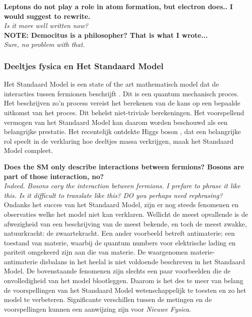 \textbf{ Leptons do not play a role in atom formation, but electron does.. I would suggest to rewrite.}\\
{\color{green}\it Is it more well written now?}\\

\textbf{NOTE: Democitus is a philosopher? That is what I wrote...}\\
{\color{green}\it Sure, no problem with that.}\\

\subsubsection{Deeltjes fysica en Het Standaard Model}
Het Standaard Model is een state of the art mathematisch model dat de interacties tussen fermionen beschrijft \cite{sm-glashow,sm-weinberg,sm-salam}. Dit is een quantum mechanisch proces. Het beschrijven zo'n process vereist het berekenen van de kans op een bepaalde uitkomst van het proces. Dit behelst niet-triviale berekeningen. Het voorspellend vermogen van het Standaard Model kan daarom worden beschouwd als een belangrijke prestatie. Het recentelijk ontdekte Higgs boson \cite{higgs-cms,higgs-atlas}, dat een belangrijke rol speelt in de verklaring hoe deeltjes massa verkrijgen, maak het Standaard Model compleet.

\textbf{Does the SM only describe interactions between fermions? Bosons are part of those interaction, no?}\\
{\color{green}\it Indeed. Bosons cary the interaction between fermions. I prefare to phrase it like this.
Is it difficult to translate like this? DO you perhaps need rephrasing?}\\

Ondanks het succes van het Standaard Model, zijn er nog steeds fenomenen en observaties welke het model niet kan verklaren. Wellicht de meest opvallende is de afwezigheid van een beschrijving van de meest bekende, en toch de meest zwakke, natuurkracht: de zwaartekracht. Een ander voorbeeld betreft antimaterie; een toestand van materie, waarbij de quantum numbers voor elektrische lading en pariteit omgekeerd zijn aan die van materie. De waargenomen materie-antimaterie disbalans in het heelal \cite{more-cpv-huet,more-cpv-gavela_I,more-cpv-gavela_II} is niet voldoende beschreven in het Standaard Model. De bovenstaande fenomenen zijn slechts een paar voorbeelden die de onvolledigheid van het model blootleggen. Daarom is het des te meer van belang de voorspellingen van het Standaard Model wetenschappelijk te toesten en zo het model te verbeteren. Significante verschillen tussen de metingen en de voorspellingen kunnen een aanwijzing zijn voor {\it Nieuwe Fysica}.



